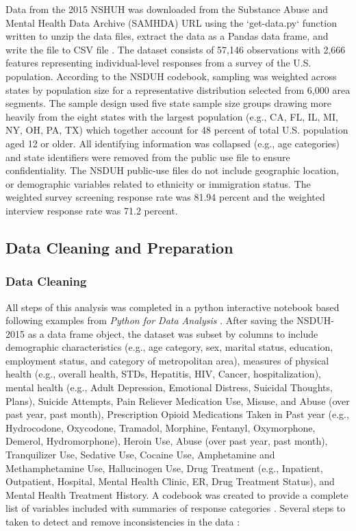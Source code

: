 \documentclass[sigconf]{acmart}
\begin{document}
Data from the 2015 NSHUH was downloaded from the Substance Abuse and Mental 
Health Data Archive (SAMHDA) \cite{samhsa16} URL using the `get-data.py` 
function written to unzip the data files, extract the data as a Pandas data 
frame, and write the file to CSV file \cite{getdata17}. The dataset consists 
of 57,146 observations with 2,666 features representing individual-level 
responses from a survey of the U.S. population. According to the NSDUH 
codebook, sampling was weighted across states by population size for a 
representative distribution selected from 6,000 area segments. The sample 
design used five state sample size groups drawing more heavily from the eight 
states with the largest population (e.g., CA, FL, IL, MI, NY, OH, PA, TX) which 
together account for 48 percent of total U.S. population aged 12 or older. 
All identifying information was collapsed (e.g., age categories) and state 
identifiers were removed from the public use file to ensure confidentiality. 
The NSDUH public-use files do not include geographic location, or demographic 
variables related to ethnicity or immigration status. The weighted survey 
screening response rate was 81.94 percent and the weighted interview response 
rate was 71.2 percent. 

\subsection{Data Cleaning and Preparation }

\subsubsection{Data Cleaning}
All steps of this analysis was completed in a python interactive notebook 
\cite{data17} based following examples from \emph{Python for Data Analysis}
\cite{mckinney17}. After saving the NSDUH-2015 as a data frame object, the 
dataset was subset by columns to include demographic characteristics (e.g., 
age category, sex, marital status, education, employment status, and category 
of metropolitan area), measures of physical health (e.g., overall health, 
STDs, Hepatitis, HIV, Cancer, hospitalization), mental health (e.g., Adult 
Depression, Emotional Distress, Suicidal Thoughts, Plans), Suicide Attempts, 
Pain Reliever Medication Use, Misuse, and Abuse (over past year, past month), 
Prescription Opioid Medications Taken in Past year (e.g., Hydrocodone, 
Oxycodone, Tramadol, Morphine, Fentanyl, Oxymorphone, Demerol, Hydromorphone), 
Heroin Use, Abuse (over past year, past month), Tranquilizer Use, Sedative Use, 
Cocaine Use, Amphetamine and Methamphetamine Use, Hallucinogen Use, Drug 
Treatment (e.g., Inpatient, Outpatient, Hospital, Mental Health Clinic, ER, 
Drug Treatment Status), and Mental Health Treatment History. A codebook was 
created to provide a complete list of variables included with summaries 
of response categories \cite{codebook17}. Several steps to taken to detect 
and remove inconsistencies in the data \cite{rahm00}: 
\end{document}
